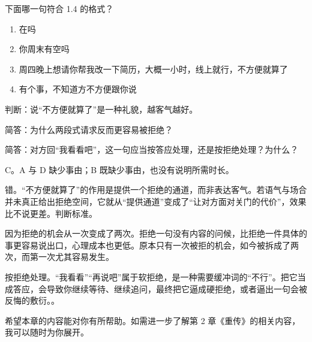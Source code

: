 \begin{quizsec}
\item 下面哪一句符合 1.4 的格式？

\begin{enumerate}[label=\Alph*., leftmargin=2.2em, labelsep=0.6em,
                  itemsep=0.2em, topsep=0.3em, parsep=0.1em]
\item 在吗
\item 你周末有空吗
\item 周四晚上想请你帮我改一下简历，大概一小时，线上就行，不方便就算了
\item 有个事，不知道方不方便跟你说
\end{enumerate}

\item 判断：说“不方便就算了”是一种礼貌，越客气越好。

\item 简答：为什么两段式请求反而更容易被拒绝？

\item 简答：对方回“我看看吧”，这一句应当按答应处理，还是按拒绝处理？为什么？
\end{quizsec}

\begin{answerssec}
\item C。A 与 D 缺少事由；B 既缺少事由，也没有说明所需时长。

\item 错。“不方便就算了”的作用是提供一个拒绝的通道，而非表达客气。若语气与场合并未真正给出拒绝空间，它就从“提供通道”变成了“让对方面对关门的代价”，效果比不说更差。判断标准。

\item 因为拒绝的机会从一次变成了两次。拒绝一句没有内容的问候，比拒绝一件具体的事更容易说出口，心理成本也更低。原本只有一次被拒的机会，如今被拆成了两次，而第一次尤其容易发生。

\item 按拒绝处理。“我看看”“再说吧”属于软拒绝，是一种需要缓冲词的“不行”。把它当成答应，会导致你继续等待、继续追问，最终把它逼成硬拒绝，或者逼出一句会被反悔的敷衍。。
\end{answerssec}

\hcirule

\begin{qabox}
\end{qabox}

\hcirule

\begin{qabox}
\end{qabox}

\hcirule

希望本章的内容能对你有所帮助。如需进一步了解第 2 章《重传》的相关内容，我可以随时为你展开。

